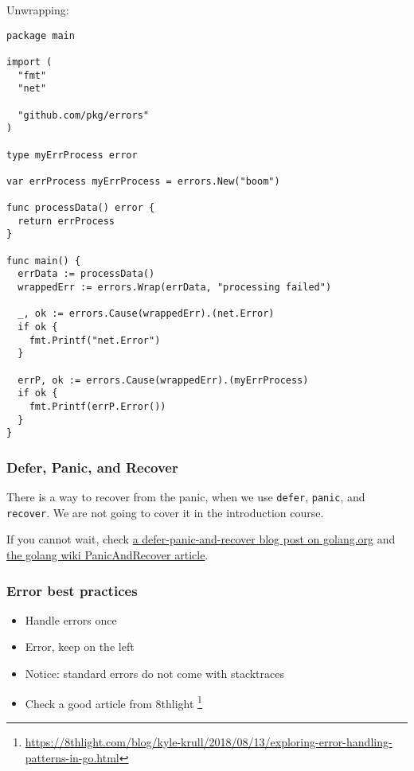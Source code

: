 \documentclass[11pt, letterpaper]{article}
\begin{document}
Unwrapping:

\begin{verbatim}
package main

import (
  "fmt"
  "net"

  "github.com/pkg/errors"
)

type myErrProcess error

var errProcess myErrProcess = errors.New("boom")

func processData() error {
  return errProcess
}

func main() {
  errData := processData()
  wrappedErr := errors.Wrap(errData, "processing failed")

  _, ok := errors.Cause(wrappedErr).(net.Error)
  if ok {
    fmt.Printf("net.Error")
  }

  errP, ok := errors.Cause(wrappedErr).(myErrProcess)
  if ok {
    fmt.Printf(errP.Error())
  }
}
\end{verbatim}

\subsubsection{Defer, Panic, and Recover}

There is a way to recover from the panic, when we use \verb|defer|, \verb|panic|, and \verb|recover|. We are not going to cover it in the introduction course.

If you cannot wait, check \href{https://blog.golang.org/defer-panic-and-recover}{a defer-panic-and-recover blog post on golang.org} and \href{https://github.com/golang/go/wiki/PanicAndRecover}{the golang wiki PanicAndRecover article}.

\subsubsection{Error best practices}

\begin{itemize}
\item Handle errors once
\item Error, keep on the left
\item Notice: standard errors do not come with stacktraces
\item Check a good article from 8thlight \footnote{\href{https://8thlight.com/blog/kyle-krull/2018/08/13/exploring-error-handling-patterns-in-go.html}{https://8thlight.com/blog/kyle-krull/2018/08/13/exploring-error-handling-patterns-in-go.html}}
\end{itemize}
\end{document}
